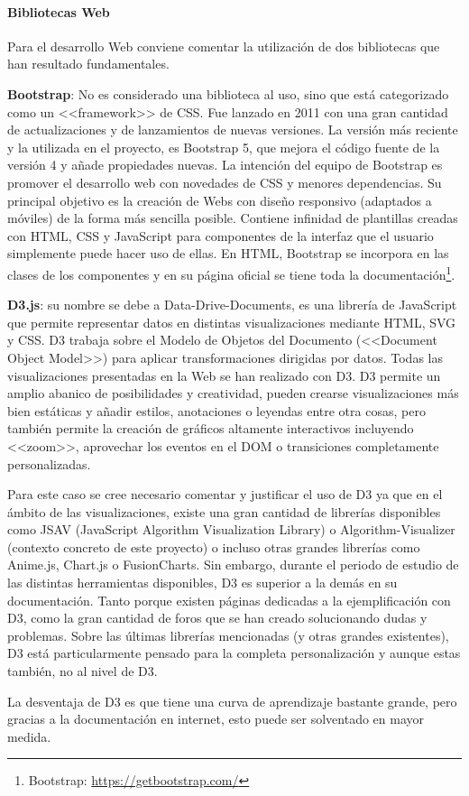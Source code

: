 \paragraph{Bibliotecas Web} Para el desarrollo Web conviene comentar la
utilización de dos bibliotecas que han resultado fundamentales.

\textbf{Bootstrap}: No es considerado una biblioteca al uso, sino que está
categorizado como un <<framework>> de CSS. Fue lanzado en 2011 con una gran
cantidad de actualizaciones y de lanzamientos de nuevas versiones. La versión
más reciente y la utilizada en el proyecto, es Bootstrap 5, que mejora el código
fuente de la versión 4 y añade propiedades nuevas. La intención del equipo de
Bootstrap es promover el desarrollo web con novedades de CSS y menores
dependencias. Su principal objetivo es la creación de Webs con diseño responsivo
(adaptados a móviles) de la forma más sencilla posible. Contiene infinidad de
plantillas creadas con HTML, CSS y JavaScript para componentes de la interfaz
que el usuario simplemente puede hacer uso de ellas. En HTML, Bootstrap se
incorpora en las clases de los componentes y en su página oficial se tiene toda
la documentación\footnote{Bootstrap: \url{https://getbootstrap.com/}}.

\textbf{D3.js}: su nombre se debe a Data-Drive-Documents, es una librería de
JavaScript que permite representar datos en distintas visualizaciones mediante
HTML, SVG y CSS. D3 trabaja sobre el Modelo de Objetos del Documento (<<Document
Object Model>>) para aplicar transformaciones dirigidas por datos. Todas las
visualizaciones presentadas en la Web se han realizado con D3. D3 permite un
amplio abanico de posibilidades y creatividad, pueden crearse visualizaciones
más bien estáticas y añadir estilos, anotaciones o leyendas entre otra cosas,
pero también permite la creación de gráficos altamente interactivos incluyendo
<<zoom>>, aprovechar los eventos en el DOM o transiciones completamente
personalizadas.

Para este caso se cree necesario comentar y justificar el uso de D3 ya que en el
ámbito de las visualizaciones, existe una gran cantidad de librerías disponibles
como JSAV (JavaScript Algorithm Visualization Library) o Algorithm-Visualizer
(contexto concreto de este proyecto) o incluso otras grandes librerías como
Anime.js, Chart.js o FusionCharts. Sin embargo, durante el periodo de estudio de
las distintas herramientas disponibles, D3 es superior a la demás en su
documentación. Tanto porque existen páginas dedicadas a la ejemplificación con
D3, como la gran cantidad de foros que se han creado solucionando dudas y
problemas. Sobre las últimas librerías mencionadas (y otras grandes existentes),
D3 está particularmente pensado para la completa personalización y aunque estas
también, no al nivel de D3.

La desventaja de D3 es que tiene una curva de aprendizaje bastante grande, pero
gracias a la documentación en internet, esto puede ser solventado en mayor
medida.
